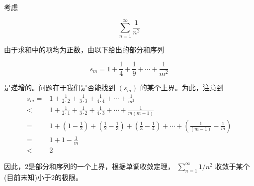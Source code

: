 \begin{Eg}
  \label{eg:2.4.4}
考虑

\[
\mathop{\sum }\limits_{{n = 1}}^{\infty }\frac{1}{{n}^{2}}
\]

由于求和中的项均为正数，由以下给出的部分和序列

\[
{s}_{m} = 1 + \frac{1}{4} + \frac{1}{9} + \cdots  + \frac{1}{{m}^{2}}
\]

是递增的。问题在于我们是否能找到 \(\left( {s}_{m}\right)\) 的某个上界。为此，注意到
\begin{align*}
{s}_{m} = & 1 + \frac{1}{2 \cdot  2} + \frac{1}{3 \cdot  3} + \frac{1}{4 \cdot  4} + \cdots  + \frac{1}{{m}^{2}}\\
<& 1 + \frac{1}{2 \cdot  1} + \frac{1}{3 \cdot  2} + \frac{1}{4 \cdot  3} + \cdots  + \frac{1}{m\left( {m - 1}\right) }\\
= &1 + \left( {1 - \frac{1}{2}}\right)  + \left( {\frac{1}{2} - \frac{1}{3}}\right)  + \left( {\frac{1}{3} - \frac{1}{4}}\right)  + \cdots  + \left( {\frac{1}{\left( m - 1\right) } - \frac{1}{m}}\right)\\
= & 1 + 1 - \frac{1}{m}\\
  < & 2
\end{align*}

因此，$2$是部分和序列的一个上界，根据单调收敛定理， \(\mathop{\sum }\limits_{{n = 1}}^{\infty }1/{n}^{2}\) 收敛于某个(目前未知)小于$2$的极限。  
\end{Eg}


